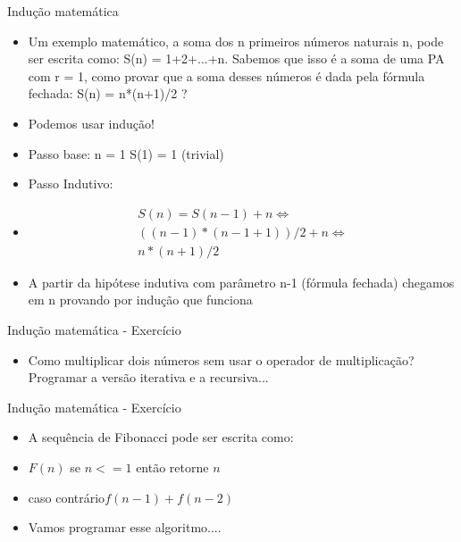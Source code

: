\begin{frame}
	\begin{block}{Indução matemática}
		\begin{itemize}
			\item Um exemplo matemático, a soma dos n primeiros números naturais n, pode ser escrita como: S(n) = 1+2+...+n. Sabemos que isso é a soma de uma PA com r = 1, como provar que a soma desses números é dada pela fórmula fechada: S(n) = n*(n+1)/2 ?

\item Podemos usar indução!

\item Passo base: n = 1 S(1) = 1 (trivial)

\item Passo Indutivo: 

\item  
\begin{eqnarray}
		S(n) = S(n-1) + n \Leftrightarrow \\
		((n-1) *(n-1+1) )/2 + n \Leftrightarrow \\
		n*(n+1) / 2
\end{eqnarray}

\item A partir da hipótese indutiva com parâmetro n-1 (fórmula fechada) chegamos em n provando por indução que funciona
		\end{itemize}
	\end{block}
\end{frame}

\begin{frame}
	\begin{block}{Indução matemática - Exercício}
		\begin{itemize}
			\item Como multiplicar dois números sem usar o operador de multiplicação? Programar a versão iterativa e a recursiva...
		\end{itemize}
	\end{block}
\end{frame}

\begin{frame}
	\begin{block}{Indução matemática - Exercício}
		\begin{itemize}
			\item A sequência de Fibonacci pode ser escrita como:

			\item $F(n)$  se $n <= 1$ então retorne $n$
			\item caso contrário$f(n-1) + f(n-2)$
			
			\item Vamos programar esse algoritmo....
		\end{itemize}
	\end{block}
\end{frame}

